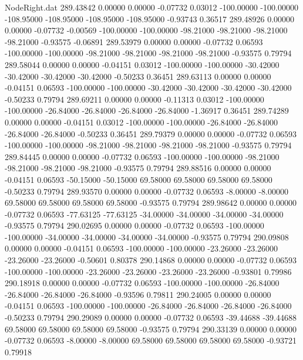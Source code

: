 \begin{filecontents}{NodeRight.dat}
 289.43842    0.00000    0.00000    -0.07732    0.03012 -100.00000 -100.00000 -108.95000 -108.95000 -108.95000 -108.95000   -0.93743    0.36517
 289.48926    0.00000    0.00000    -0.07732   -0.00569 -100.00000 -100.00000  -98.21000  -98.21000  -98.21000  -98.21000   -0.93575   -0.06891
 289.53979    0.00000    0.00000    -0.07732    0.06593 -100.00000 -100.00000  -98.21000  -98.21000  -98.21000  -98.21000   -0.93575    0.79794
 289.58044    0.00000    0.00000    -0.04151    0.03012 -100.00000 -100.00000  -30.42000  -30.42000  -30.42000  -30.42000   -0.50233    0.36451
 289.63113    0.00000    0.00000    -0.04151    0.06593 -100.00000 -100.00000  -30.42000  -30.42000  -30.42000  -30.42000   -0.50233    0.79794
 289.69211    0.00000    0.00000    -0.11313    0.03012 -100.00000 -100.00000  -26.84000  -26.84000  -26.84000  -26.84000   -1.36917    0.36451
 289.74289    0.00000    0.00000    -0.04151    0.03012 -100.00000 -100.00000  -26.84000  -26.84000  -26.84000  -26.84000   -0.50233    0.36451
 289.79379    0.00000    0.00000    -0.07732    0.06593 -100.00000 -100.00000  -98.21000  -98.21000  -98.21000  -98.21000   -0.93575    0.79794
 289.84445    0.00000    0.00000    -0.07732    0.06593 -100.00000 -100.00000  -98.21000  -98.21000  -98.21000  -98.21000   -0.93575    0.79794
 289.88516    0.00000    0.00000    -0.04151    0.06593  -50.15000  -50.15000   69.58000   69.58000   69.58000   69.58000   -0.50233    0.79794
 289.93570    0.00000    0.00000    -0.07732    0.06593   -8.00000   -8.00000   69.58000   69.58000   69.58000   69.58000   -0.93575    0.79794
 289.98642    0.00000    0.00000    -0.07732    0.06593  -77.63125  -77.63125  -34.00000  -34.00000  -34.00000  -34.00000   -0.93575    0.79794
 290.02695    0.00000    0.00000    -0.07732    0.06593 -100.00000 -100.00000  -34.00000  -34.00000  -34.00000  -34.00000   -0.93575    0.79794
 290.09808    0.00000    0.00000    -0.04151    0.06593 -100.00000 -100.00000  -23.26000  -23.26000  -23.26000  -23.26000   -0.50601    0.80378
 290.14868    0.00000    0.00000    -0.07732    0.06593 -100.00000 -100.00000  -23.26000  -23.26000  -23.26000  -23.26000   -0.93801    0.79986
 290.18918    0.00000    0.00000    -0.07732    0.06593 -100.00000 -100.00000  -26.84000  -26.84000  -26.84000  -26.84000   -0.93596    0.79811
 290.24005    0.00000    0.00000    -0.04151    0.06593 -100.00000 -100.00000  -26.84000  -26.84000  -26.84000  -26.84000   -0.50233    0.79794
 290.29089    0.00000    0.00000    -0.07732    0.06593  -39.44688  -39.44688   69.58000   69.58000   69.58000   69.58000   -0.93575    0.79794
 290.33139    0.00000    0.00000    -0.07732    0.06593   -8.00000   -8.00000   69.58000   69.58000   69.58000   69.58000   -0.93721    0.79918

\end{filecontents}

